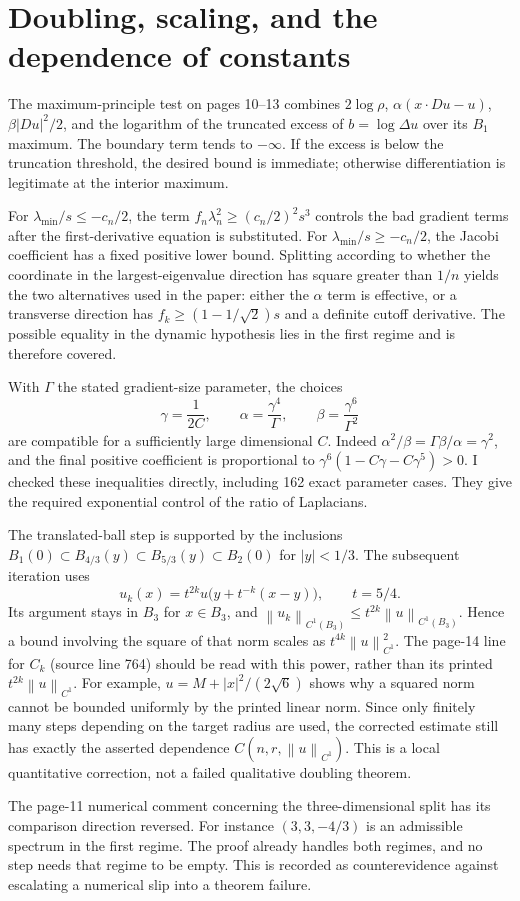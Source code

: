 \documentclass[10pt]{article}
\begin{document}
\section*{Doubling, scaling, and the dependence of constants}
The maximum-principle test on pages 10–13 combines \(2\log\rho\), \(\alpha(x\cdot Du-u)\), \(\beta|Du|^2/2\), and the logarithm of the truncated excess of \(b=\log\Delta u\) over its \(B_1\) maximum. The boundary term tends to \(-\infty\). If the excess is below the truncation threshold, the desired bound is immediate; otherwise differentiation is legitimate at the interior maximum.\par
For \(\lambda_{\min}/s\le-c_n/2\), the term \(f_n\lambda_n^2\ge(c_n/2)^2s^3\) controls the bad gradient terms after the first-derivative equation is substituted. For \(\lambda_{\min}/s\ge-c_n/2\), the Jacobi coefficient has a fixed positive lower bound. Splitting according to whether the coordinate in the largest-eigenvalue direction has square greater than \(1/n\) yields the two alternatives used in the paper: either the \(\alpha\) term is effective, or a transverse direction has \(f_k\ge(1-1/\sqrt2)s\) and a definite cutoff derivative. The possible equality in the dynamic hypothesis lies in the first regime and is therefore covered.\par
With \(\Gamma\) the stated gradient-size parameter, the choices \[\gamma=\frac1{2C},\qquad
 \alpha=\frac{\gamma^4}{\Gamma},\qquad
 \beta=\frac{\gamma^6}{\Gamma^2}\] are compatible for a sufficiently large dimensional \(C\). Indeed \(\alpha^2/\beta=\Gamma\beta/\alpha=\gamma^2\), and the final positive coefficient is proportional to \(\gamma^6(1-C\gamma-C\gamma^5)>0\). I checked these inequalities directly, including 162 exact parameter cases. They give the required exponential control of the ratio of Laplacians.\par
The translated-ball step is supported by the inclusions \(B_1(0)\subset B_{4/3}(y)\subset B_{5/3}(y)\subset B_2(0)\) for \(|y|<1/3\). The subsequent iteration uses \[u_k(x)=t^{2k}u\bigl(y+t^{-k}(x-y)\bigr),\qquad t=5/4.\] Its argument stays in \(B_3\) for \(x\in B_3\), and \(\left\lVert u_k\right\rVert_{C^1(B_3)}\le t^{2k}\left\lVert u\right\rVert_{C^1(B_3)}\). Hence a bound involving the square of that norm scales as \(t^{4k}\left\lVert u\right\rVert_{C^1}^2\). The page-14 line for \(C_k\) (source line 764) should be read with this power, rather than its printed \(t^{2k}\left\lVert u\right\rVert_{C^1}\). For example, \(u=M+|x|^2/(2\sqrt6)\) shows why a squared norm cannot be bounded uniformly by the printed linear norm. Since only finitely many steps depending on the target radius are used, the corrected estimate still has exactly the asserted dependence \(C(n,r,\left\lVert u\right\rVert_{C^1})\). This is a local quantitative correction, not a failed qualitative doubling theorem.\par
The page-11 numerical comment concerning the three-dimensional split has its comparison direction reversed. For instance \((3,3,-4/3)\) is an admissible spectrum in the first regime. The proof already handles both regimes, and no step needs that regime to be empty. This is recorded as counterevidence against escalating a numerical slip into a theorem failure.\par
\end{document}
